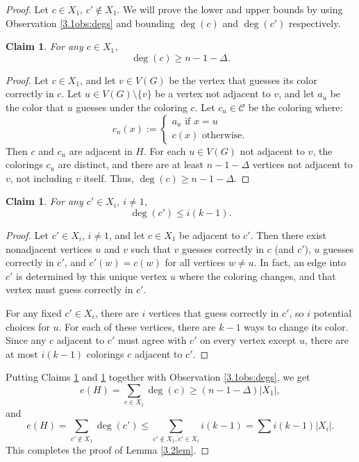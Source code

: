 \documentclass{amsart}
\newcommand{\1}{\mathds{1}}
\newtheorem{claim}[theorem]{Claim}
\numberwithin{theorem}{section}
\newcommand{\darkBlue}[1]{{\color{DarkBlue}{#1}}}
\newcommand{\mason}[1]{\darkBlue{\bf [Mason: #1]}}
\begin{document}
\begin{proof}
Let $c \in X_1$, $c' \not \in X_1$. We will prove the lower and upper bounds by using Observation \ref{3.1obs:degs} and bounding $\deg (c)$ and $\deg(c')$ respectively.
\begin{claim}\label{3.3clm} For any $c\in X_1$, 
    $$\deg (c)\geq n-1-\Delta.$$
\end{claim}
\begin{proof}
    Let $c \in X_1$, and let $v \in V(G)$ be the vertex that guesses its color correctly in $c$. Let $u \in V(G)\setminus \{v\}$ be a vertex not adjacent to $v$, and let $a_u$ be the color that $u$ guesses under the coloring $c$. 
        Let $c_u \in \mathcal{C}$ be the coloring where:
        $$c_u(x):= \begin{cases} a_u \text{ if }x = u \\c(x) \text{ otherwise.}
        \end{cases}$$
        Then $c$ and $c_u$ are adjacent in $H$. For each $u \in V(G)$ not adjacent to $v$, the colorings $c_u$ are distinct, and there are at least $n-1-\Delta$ vertices not adjacent to $v$, not including $v$ itself. Thus, $\deg(c)\geq n-1-\Delta$. %
\end{proof}
\begin{claim}\label{3.4clm} For any $c'\in X_i$, $i\neq 1$,  
    $$\deg(c')\leq  i(k-1).$$
\end{claim}
\begin{proof}
    Let $c' \in X_i$, $i\neq 1$, and let $c \in X_1$ be adjacent to $c'$. Then there exist nonadjacent vertices $u$ and $v$ such that $v$ guesses correctly in $c$ (and $c'$), $u$ guesses correctly in $c'$, and $c'(w)=c(w)$ for all vertices $w \neq u$.
    In fact, an edge into $c'$ is determined by this unique vertex $u$ where the coloring changes, and that vertex must guess correctly in $c'$. 

    
    For any fixed $c' \in X_i$, there are $i$ vertices that guess correctly in $c'$, so $i$ potential choices for $u$. For each of these vertices, there are $k-1$ ways to change its color. Since any $c$ adjacent to $c'$ must agree with $c'$ on every vertex except $u$, there are at most $i(k-1)$ colorings $c$ adjacent to $c'$. %
\end{proof}

Putting Claims \ref{3.3clm} and \ref{3.4clm} together with Observation \ref{3.1obs:degs}, we get %
$$e(H)=\sum_{c\in X_1}  \deg (c)\geq (n-1-\Delta)|X_1|,$$ and $$e(H)=\sum_{c' \notin X_1} \deg(c')\leq \sum _{c' \notin X_1, c' \in X_i} i(k-1)=\sum i(k-1)|X_i|.$$
This completes the proof of Lemma \ref{3.2lem}.
\end{proof}
\end{document}
